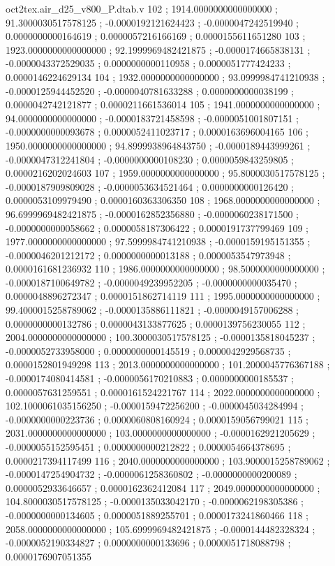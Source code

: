 \begin{filecontents}[overwrite]{oct2tex.air_d25_v800_P.dtab.v}
102 ; 1914.0000000000000000 ; 91.3000030517578125 ; -0.0000192121624423 ; -0.0000047242519940 ; 0.0000000000164619 ; 0.0000057216166169 ; 0.0000155611651280
103 ; 1923.0000000000000000 ; 92.1999969482421875 ; -0.0000174665838131 ; -0.0000043372529035 ; 0.0000000000110958 ; 0.0000051777424233 ; 0.0000146224629134
104 ; 1932.0000000000000000 ; 93.0999984741210938 ; -0.0000125944452520 ; -0.0000040781633288 ; 0.0000000000038199 ; 0.0000042742121877 ; 0.0000211661536014
105 ; 1941.0000000000000000 ; 94.0000000000000000 ; -0.0000183721458598 ; -0.0000051001807151 ; -0.0000000000093678 ; 0.0000052411023717 ; 0.0000163696004165
106 ; 1950.0000000000000000 ; 94.8999938964843750 ; -0.0000189443999261 ; -0.0000047312241804 ; -0.0000000000108230 ; 0.0000059843259805 ; 0.0000216202024603
107 ; 1959.0000000000000000 ; 95.8000030517578125 ; -0.0000187909809028 ; -0.0000053634521464 ; 0.0000000000126420 ; 0.0000053109979490 ; 0.0000160363306350
108 ; 1968.0000000000000000 ; 96.6999969482421875 ; -0.0000162852356880 ; -0.0000060238171500 ; -0.0000000000058662 ; 0.0000058187306422 ; 0.0000191737799469
109 ; 1977.0000000000000000 ; 97.5999984741210938 ; -0.0000159195151355 ; -0.0000046201212172 ; 0.0000000000013188 ; 0.0000053547973948 ; 0.0000161681236932
110 ; 1986.0000000000000000 ; 98.5000000000000000 ; -0.0000187100649782 ; -0.0000049239952205 ; -0.0000000000035470 ; 0.0000048896272347 ; 0.0000151862714119
111 ; 1995.0000000000000000 ; 99.4000015258789062 ; -0.0000135886111821 ; -0.0000049157006288 ; 0.0000000000132786 ; 0.0000043133877625 ; 0.0000139756230055
112 ; 2004.0000000000000000 ; 100.3000030517578125 ; -0.0000135818045237 ; -0.0000052733958000 ; 0.0000000000145519 ; 0.0000042929568735 ; 0.0000152801949298
113 ; 2013.0000000000000000 ; 101.2000045776367188 ; -0.0000174080414581 ; -0.0000056170210883 ; 0.0000000000185537 ; 0.0000057631259551 ; 0.0000161524221767
114 ; 2022.0000000000000000 ; 102.1000061035156250 ; -0.0000159472256200 ; -0.0000045034284994 ; -0.0000000000223736 ; 0.0000060808160924 ; 0.0000159056799021
115 ; 2031.0000000000000000 ; 103.0000000000000000 ; -0.0000162921205629 ; -0.0000055152595451 ; 0.0000000000212822 ; 0.0000054664378695 ; 0.0000217394117499
116 ; 2040.0000000000000000 ; 103.9000015258789062 ; -0.0000147254904732 ; -0.0000061258360802 ; -0.0000000000200089 ; 0.0000052933646657 ; 0.0000162362412084
117 ; 2049.0000000000000000 ; 104.8000030517578125 ; -0.0000135033042170 ; -0.0000062198305386 ; -0.0000000000134605 ; 0.0000051889255701 ; 0.0000173241860466
118 ; 2058.0000000000000000 ; 105.6999969482421875 ; -0.0000144482328324 ; -0.0000052190334827 ; 0.0000000000133696 ; 0.0000051718088798 ; 0.0000176907051355

\end{filecontents}
